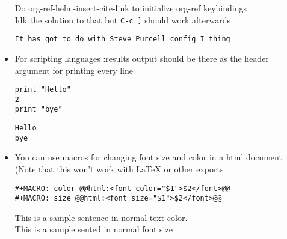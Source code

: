 \documentclass[11pt]{article}
\begin{document}
\begin{itemize}
Do org-ref-helm-insert-cite-link to initialize org-ref keybindings \\
Idk the solution to that but \texttt{C-c ]} should work afterwards \\
\begin{verbatim}
It has got to do with Steve Purcell config I thing
\end{verbatim}
\item For scripting languages :results output should be there as the header argument for printing every line
\begin{verbatim}
print "Hello"
2
print "bye"
\end{verbatim}

\begin{verbatim}
Hello
bye
\end{verbatim}

\item You can use macros for changing font size and color in a html document (Note that this won't work with \LaTeX{} or other exports
\begin{verbatim}
#+MACRO: color @@html:<font color="$1">$2</font>@@
#+MACRO: size @@html:<font size="$1">$2</font>@@
\end{verbatim}

This is a sample sentence in normal text color.\\

This is a sample sented in normal font size \\
\end{itemize}
\end{document}
